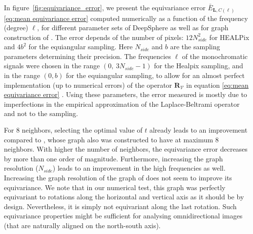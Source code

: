 \documentclass{article} %
\renewcommand{\b}[1]{{\bm{#1}}}  %
\newcommand{\V}{\mathcal{V}}  %
\newcommand{\figref}[1]{figure~\ref{fig:#1}}
\begin{document}
In \figref{equivariance_error}, we present the equivariance error $\bar{E}_{\b L,C(\ell)}$ \eqref{eq:mean equivariance error} computed numerically as a function of the frequency (degree) $\ell$, for different parameter sets of DeepSphere as well as for graph construction of \cite{khasanova2017sphericalcnn}.
The error depends of the number of pixels: $12N_{side}^2$ for HEALPix and $4b^2$ for the equiangular sampling. Here $N_{side}$ and $b$ are the sampling parameters determining their precision.
The frequencies $\ell$ of the monochromatic signals were chosen in the range $(0,\  3N_{side}-1)$ for the Healpix sampling, and in the range $(0, b)$ for the equiangular sampling, to allow for an almost perfect implementation (up to numerical errors) of the operator $\b{R}_\V$ in equation \eqref{eq:mean equivariance error} \citep{gorski1999healpixprimer}. 
Using these parameters, the error measured is mostly due to imperfections in the empirical approximation of the Laplace-Beltrami operator and not to the sampling.

For 8 neighbors, selecting the optimal value of $t$ already leads to an improvement compared to \cite{perraudin2019deepspherecosmo}, whose graph also was constructed to have at maximum 8 neighbors. 
With higher the number of neighbors, the equivariance error decreases by more than one order of magnitude. 
Furthermore, increasing the graph resolution ($N_{side}$) leads to an improvement in the high frequencies as well. 
Increasing the graph resolution of the graph of \cite{khasanova2017sphericalcnn} does not seem to improve its equivariance. We note that in our numerical test, this graph was perfectly equivariant to rotations along the horizontal and vertical axis as it should be by design. Nevertheless, it is simply not equivariant along the last rotation. Such equivariance properties might be sufficient for analysing omnidirectional images (that are naturally aligned on the north-south axis).
\end{document}
